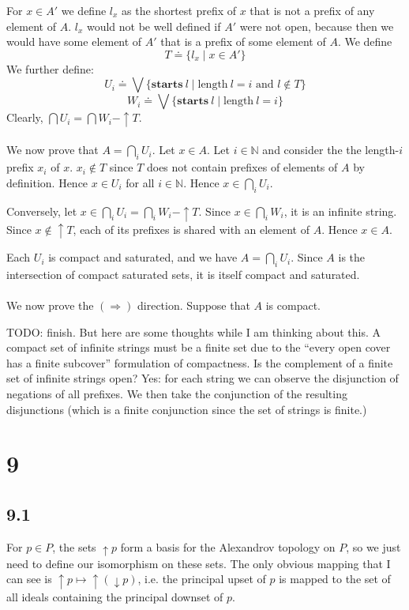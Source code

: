 \documentclass{article}
\newcommand{\mbf}{\mathbf}
\begin{document}
For $x \in A'$ we define $l_x$ as the shortest prefix of $x$ that is not a prefix of any element of $A$. $l_x$ would not be well defined if $A'$ were not open, because then we would have some element of $A'$ that is a prefix of some element of $A$. We define
$$T \doteq \{ l_x \mid x \in A' \}$$
We further define:
$$U_i \doteq \bigvee \{ \mbf{starts}~l \mid \text{length}~l = i \text{ and } l \not \in T \} $$
$$W_i \doteq  \bigvee \{ \mbf{starts}~l \mid \text{length}~l = i \}$$
Clearly, $\bigcap U_i = \bigcap W_i - \uparrow T$.\\~\\
We now prove that $A = \bigcap_{i} U_i$. Let $x \in A$. Let $i \in \mathbb N$ and consider the the length-$i$ prefix $x_i$ of $x$. $x_i \not \in T$ since $T$ does not contain prefixes of elements of $A$ by definition. Hence $x \in U_i$ for all $i \in \mathbb N$. Hence $x \in \bigcap_{i} U_i$.

Conversely, let $x \in \bigcap_i U_i = \bigcap_i W_i - \uparrow T$. Since $x \in \bigcap_i W_i$, it is an infinite string. Since $x \not \in \uparrow T$, each of its prefixes is shared with an element of $A$. Hence $x \in A$.

Each $U_i$ is compact and saturated, and we have $A = \bigcap_{i} U_i$. Since $A$ is the intersection of compact saturated sets,
it is itself compact and saturated. \\~\\
We now prove the $(\Rightarrow)$ direction. Suppose that $A$ is compact.

TODO: finish. But here are some thoughts while I am thinking about this. A compact set of infinite strings must be a finite set due to the ``every open cover has a finite subcover'' formulation of compactness. Is the complement of a finite set of infinite strings open? Yes: for each string we can observe the disjunction of negations of all prefixes. We then take the conjunction of the resulting disjunctions (which is a finite conjunction since the set of strings is finite.)

\section*{9}

\subsection*{9.1}

For $p \in P$, the sets $\uparrow p$ form a basis for the Alexandrov topology on $P$, so we just need to define our isomorphism on these sets.
The only obvious mapping that I can see is $\uparrow p \mapsto \uparrow (\downarrow p)$, i.e. the principal upset of $p$ is mapped to the set of all ideals containing the principal downset of $p$.
\end{document}
